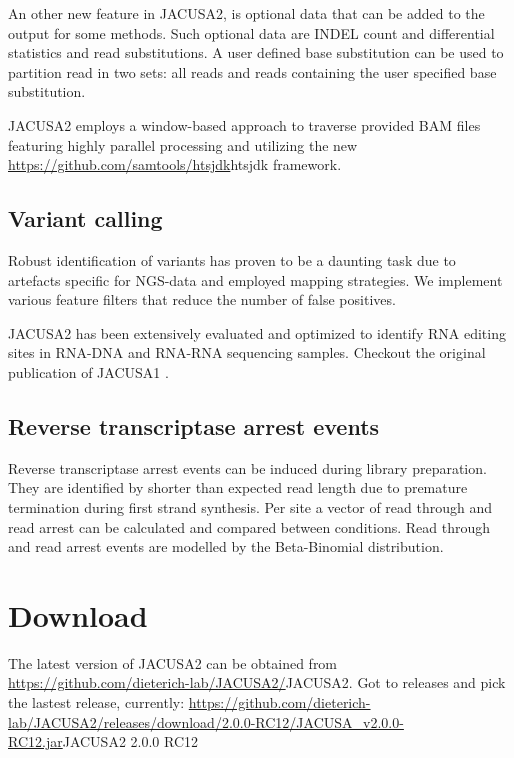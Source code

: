 \documentclass[10pt,a4paper]{article}
\begin{document}
An other new feature in JACUSA2, is optional data that can be added to the output for some methods. 
Such optional data are INDEL count and differential statistics and read substitutions.
A user defined base substitution can be used to partition read in two sets: all reads and reads 
containing the user specified base substitution.   
 
JACUSA2 employs a window-based approach to traverse provided BAM files featuring highly parallel 
processing and utilizing the new \url{https://github.com/samtools/htsjdk}{htsjdk} framework.
\subsection{Variant calling}
Robust identification of variants has proven to be a daunting task due to artefacts specific 
for NGS-data and employed mapping strategies. 
We implement various feature filters that reduce the number of false positives. 

JACUSA2 has been extensively evaluated and optimized to identify RNA editing sites in RNA-DNA and
RNA-RNA sequencing samples. Checkout the original publication of JACUSA1 \cite{Piechotta2017}.
\subsection{Reverse transcriptase arrest events}
Reverse transcriptase arrest events can be induced during library preparation. 
They are identified by shorter than expected read length due to premature termination during first 
strand synthesis. Per site a vector of read through and read arrest can be calculated and compared 
between conditions. Read through and read arrest events are modelled by the Beta-Binomial distribution.
\section{Download}
The latest version of JACUSA2 can be obtained from \url{https://github.com/dieterich-lab/JACUSA2/}{JACUSA2}.
Got to releases and pick the lastest release, currently: 
\url{https://github.com/dieterich-lab/JACUSA2/releases/download/2.0.0-RC12/JACUSA_v2.0.0-RC12.jar}{JACUSA2 2.0.0 RC12} 
\end{document}
